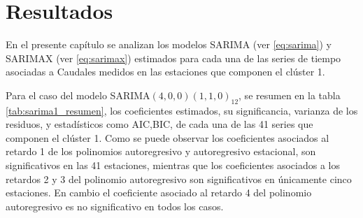 \documentclass[12pt,oneside]{book}\usepackage[]{graphicx}\usepackage[]{color}
\theoremstyle{definition} %
\begin{document}

\chapter{Resultados}
\label{chap:resultados}
En el presente capítulo se analizan los modelos SARIMA (ver \ref{eq:sarima}) y SARIMAX (ver \ref{eq:sarimax}) estimados para cada una de las series de tiempo asociadas a Caudales medidos en las estaciones que componen el clúster 1. 



Para el caso del modelo SARIMA$(4,0,0)(1,1,0)_{12}$, se resumen en la tabla \ref{tab:sarima1_resumen}, los coeficientes estimados, su significancia, varianza de los residuos, y estadísticos como AIC,BIC, de cada una de las 41 series que componen el clúster 1. Como se puede observar los coeficientes asociados al retardo 1 de los polinomios autoregresivo y autoregresivo estacional, son significativos en las 41 estaciones, mientras que los coeficientes asociados a los retardos 2 y 3 del polinomio autoregresivo son significativos en únicamente cinco estaciones. En cambio el coeficiente asociado al retardo 4 del polinomio autoregresivo es no significativo en todos los casos.
\end{document}
